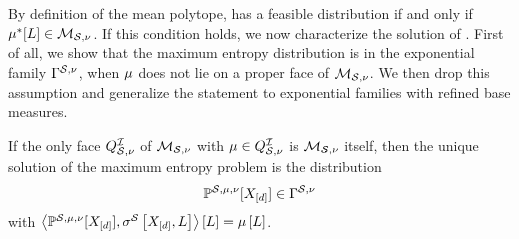 
By definition of the mean polytope,  has a feasible distribution if and only if $\mu^*[L]\in\mathcal{M}_{\mathcal{S},\nu}$.
If this condition holds, we now characterize the solution of .
First of all, we show that the maximum entropy distribution is in the exponential family $\Gamma^{\mathcal{S},\nu}$, when $\mu$ does not lie on a proper face of $\mathcal{M}_{\mathcal{S},\nu}$.
We then drop this assumption and generalize the statement to exponential families with refined base measures.

\begin{theorem} %
    \label{the:maxEntropyInterior}
    If the only face $Q^{\mathcal{I}}_{\mathcal{S},\nu}$ of $\mathcal{M}_{\mathcal{S},\nu}$ with $\mu\in Q^{\mathcal{I}}_{\mathcal{S},\nu}$ is $\mathcal{M}_{\mathcal{S},\nu}$ itself, then the unique solution of the maximum entropy problem  is the distribution
    \begin{align*}
        \mathbb{P}^{\mathcal{S},\mu,\nu}[X_{[d]}]\in\Gamma^{\mathcal{S},\nu}
    \end{align*}
    with $\left\langle \mathbb{P}^{\mathcal{S},\mu,\nu}[X_{[d]}],\sigma^{\mathcal{S}}\left[X_{[d]},L\right]\right\rangle \left[ L \right]=\mu\left[L\right]$.
\end{theorem}
